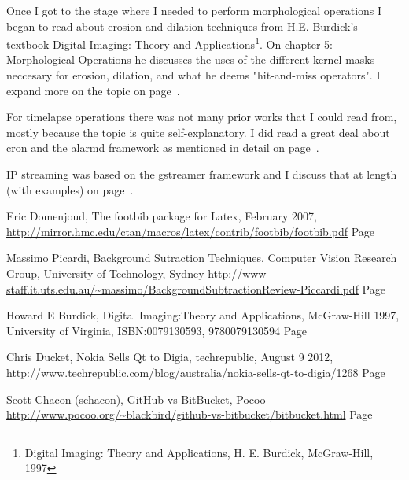 Once I got to the stage where I needed to perform morphological operations I began to read about erosion and dilation techniques from H.E. Burdick's textbook Digital Imaging: Theory and Applications\footnote{Digital Imaging: Theory and Applications, H. E. Burdick, McGraw-Hill, 1997}\label{ref:digim}. On chapter 5: Morphological Operations he discusses the uses of the different kernel masks neccesary for erosion, dilation, and what he deems "hit-and-miss operators". I expand more on the topic on page~\pageref{kernelmorph}.

For timelapse operations there was not many prior works that I could read from, mostly because the topic is quite self-explanatory. I did read a great deal about cron and the alarmd framework as mentioned in detail on page~\pageref{cronalarm}.

IP streaming was based on the gstreamer framework and I discuss that at length (with examples) on page~\pageref{gstreamertalk}.

\begin{thebibliography}{9}
Eric Domenjoud, The footbib package for Latex, February 2007, 
\url{http://mirror.hmc.edu/ctan/macros/latex/contrib/footbib/footbib.pdf}
Page~\pageref{ref:footbibpack}

Massimo Picardi, Background Sutraction Techniques, Computer Vision Research Group, University of Technology, Sydney
\url{http://www-staff.it.uts.edu.au/~massimo/BackgroundSubtractionReview-Piccardi.pdf}
Page~\pageref{ref:backsub}

Howard E Burdick, Digital Imaging:Theory and Applications, McGraw-Hill  1997, University of Virginia, ISBN:0079130593, 9780079130594
Page~\pageref{ref:digim}

Chris Ducket, Nokia Sells Qt to Digia, techrepublic, August 9 2012, 
\url{http://www.techrepublic.com/blog/australia/nokia-sells-qt-to-digia/1268}
Page~\pageref{ref:nokiasell}

Scott Chacon (schacon), GitHub vs BitBucket, Pocoo
\url{http://www.pocoo.org/~blackbird/github-vs-bitbucket/bitbucket.html}
Page~\pageref{ref:gitvs}

\end{thebibliography}
%
%